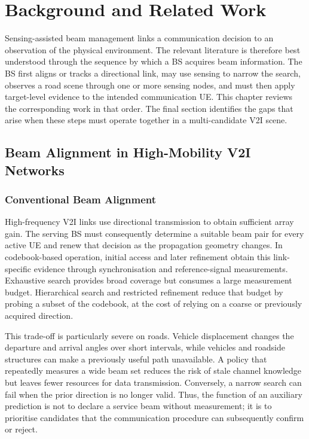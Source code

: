 \chapter{Background and Related Work}
\label{ch:background}

Sensing-assisted beam management links a communication decision to an
observation of the physical environment.  The relevant literature is therefore
best understood through the sequence by which a BS acquires beam information.
The BS first aligns or tracks a directional link, may use sensing to narrow the
search, observes a road scene through one or more sensing nodes, and must then
apply target-level evidence to the intended communication UE.  This chapter
reviews the corresponding work in that order.  The final section identifies
the gaps that arise when these steps must operate together in a multi-candidate
V2I scene.

\section{Beam Alignment in High-Mobility V2I Networks}
\label{sec:background-beam-alignment}

\subsection{Conventional Beam Alignment}
\label{subsec:background-conventional-beam-alignment}

High-frequency V2I links use directional transmission to obtain sufficient
array gain.  The serving BS must consequently determine a suitable beam pair
for every active UE and renew that decision as the propagation geometry changes.
In codebook-based operation, initial access and later refinement obtain this
link-specific evidence through synchronisation and reference-signal
measurements.  Exhaustive search provides broad coverage but consumes a large
measurement budget.  Hierarchical search and restricted refinement reduce that
budget by probing a subset of the codebook, at the cost of relying on a coarse
or previously acquired direction.

This trade-off is particularly severe on roads.  Vehicle displacement changes
the departure and arrival angles over short intervals, while vehicles and
roadside structures can make a previously useful path unavailable.  A policy
that repeatedly measures a wide beam set reduces the risk of stale channel
knowledge but leaves fewer resources for data transmission.  Conversely, a
narrow search can fail when the prior direction is no longer valid.  Thus, the
function of an auxiliary prediction is not to declare a service beam without
measurement; it is to prioritise candidates that the communication procedure
can subsequently confirm or reject.

